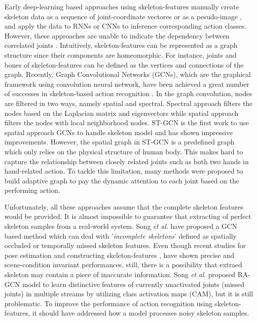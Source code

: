 \documentclass[runningheads]{llncs}
\newcommand{\etal}{\textit{et al}. }
\begin{document}
Early deep-learning based approaches using skeleton-features manually create skeleton data as a sequence of joint-coordinate vectores \cite{du2015hierarchical,shahroudy2016ntu,liu2016spatio,song2017end,zhang2017view} or as a pesudo-image \cite{ke2017new,kim2017interpretable,liu2017enhanced}, and apply the data to RNNs or CNNs to inference corresponding action classes. However, these approaches are unable to indicate the dependency between correlated joints \cite{shi2019two}. Intuitively, skeleton-features can be represented as a graph structure since their components are homeomorphic. For instance, joints and bones of skeleton-features can be defined as the vertices and connections of the graph. Recently, Graph Convolutional Networks (GCNs), which are the graphical framework using convolution neural network, have been achieved a great number of successes in skeleton-based action recognition \cite{shi2019two,si2019attention,li2019actional}. In the graph convolution, nodes are filtered in two ways, namely spatial and spectral. Spectral approach filters the nodes based on the Laplacian matrix and eigenvectors while spatial approach filters the nodes with local neighborhood nodes. ST-GCN \cite{yan2018spatial} is the first work to use spatial approach GCNs to handle skeleton model and has shown impressive improvements. However, the spatial graph in ST-GCN is a predefined graph which only relies on the physical structure of human body. This makes hard to capture the relationship between closely related joints such as both two hands in hand-related action. To tackle this limitation, many methods \cite{shi2019two,shi2019skeleton,song2019richly,li2019actional,si2019attention} were proposed to build adaptive graph to pay the dynamic attention to each joint based on the performing action.

Unfortunately, all these approaches assume that the complete skeleton features would be provided. It is almost impossible to guarantee that extracting of perfect skeleton samples from a real-world system. Song \etal \cite{song2019richly} have proposed a GCN based method which can deal with '\textit{incomplete skeletons}' defined as spatially occluded or temporally missed skeleton features. Even though recent studies for pose estimation \cite{cao2018openpose,wang2019densefusion} and constructing skeleton-features \cite{ding2017investigation,ke2017new,liu2017enhanced}, have shown precise and scene-condition invariant performances, still, there is a possibility that extraed skeleton may contain a piece of inaccurate information. Song \etal proposed RA-GCN \cite{song2019richly} model to learn distinctive features of currently unactivated joints (missed joints) in multiple streams by utilizing class activation maps (CAM), but it is still problematic. To improve the performance of action recognition using skeleton-features, it should have addressed how a model processes noisy skeleton samples. 
\end{document}
